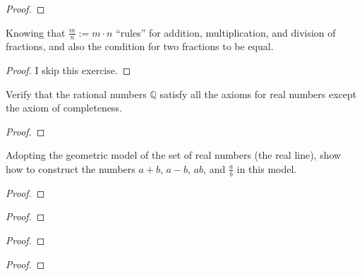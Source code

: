 \begin{proof}
\end{proof}
\newpage

\begin{exercise}
    Knowing that $\frac{m}{n} := m \cdot n$ ``rules'' for addition, multiplication, and division of fractions, and also the condition for two fractions to be equal.
\end{exercise}

\begin{proof}
    I skip this exercise.
\end{proof}
\newpage

\begin{exercise}
    Verify that the rational numbers $\mathbb{Q}$ satisfy all the axioms for real numbers except the axiom of completeness.
\end{exercise}

\begin{proof}
\end{proof}
\newpage

\begin{exercise}
    Adopting the geometric model of the set of real numbers (the real line), show how to construct the numbers $a + b$, $a - b$, $ab$, and $\frac{a}{b}$ in this model.
\end{exercise}

\begin{proof}
\end{proof}
\newpage

\begin{exercise}
\end{exercise}

\begin{proof}
\end{proof}
\newpage

\begin{exercise}
\end{exercise}

\begin{proof}
\end{proof}
\newpage

\begin{exercise}
\end{exercise}

\begin{proof}
\end{proof}
\newpage

